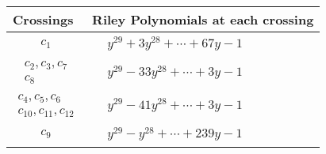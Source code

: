 \documentclass[1p]{elsarticle_modified}
\theoremstyle{definition}
\begin{document}
\begin{tabular}{m{50pt}|m{274pt}}
Crossings & \hspace{64pt}Riley Polynomials at each crossing \\
\hline $$\begin{aligned}c_{1}\end{aligned}$$&$\begin{aligned}
&y^{29}+3 y^{28}+\cdots+67 y-1
\end{aligned}$\\
\hline $$\begin{aligned}c_{2},c_{3},c_{7}\\c_{8}\end{aligned}$$&$\begin{aligned}
&y^{29}-33 y^{28}+\cdots+3 y-1
\end{aligned}$\\
\hline $$\begin{aligned}c_{4},c_{5},c_{6}\\c_{10},c_{11},c_{12}\end{aligned}$$&$\begin{aligned}
&y^{29}-41 y^{28}+\cdots+3 y-1
\end{aligned}$\\
\hline $$\begin{aligned}c_{9}\end{aligned}$$&$\begin{aligned}
&y^{29}- y^{28}+\cdots+239 y-1
\end{aligned}$\\
\hline
\end{tabular}
\vskip 2pc
\end{document}
